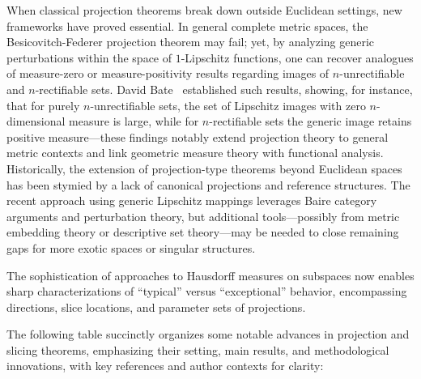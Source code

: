 \documentclass[sigconf]{acmart}
\begin{document}
When classical projection theorems break down outside Euclidean settings, new frameworks have proved essential. In general complete metric spaces, the Besicovitch-Federer projection theorem may fail; yet, by analyzing generic perturbations within the space of $1$-Lipschitz functions, one can recover analogues of measure-zero or measure-positivity results regarding images of $n$-unrectifiable and $n$-rectifiable sets. David Bate~\cite{ref43} established such results, showing, for instance, that for purely $n$-unrectifiable sets, the set of Lipschitz images with zero $n$-dimensional measure is large, while for $n$-rectifiable sets the generic image retains positive measure—these findings notably extend projection theory to general metric contexts and link geometric measure theory with functional analysis. Historically, the extension of projection-type theorems beyond Euclidean spaces has been stymied by a lack of canonical projections and reference structures. The recent approach using generic Lipschitz mappings leverages Baire category arguments and perturbation theory, but additional tools—possibly from metric embedding theory or descriptive set theory—may be needed to close remaining gaps for more exotic spaces or singular structures.

The sophistication of approaches to Hausdorff measures on subspaces now enables sharp characterizations of ``typical'' versus ``exceptional'' behavior, encompassing directions, slice locations, and parameter sets of projections.

The following table succinctly organizes some notable advances in projection and slicing theorems, emphasizing their setting, main results, and methodological innovations, with key references and author contexts for clarity:
\end{document}
